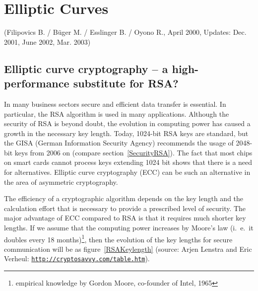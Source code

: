 
\newpage
\hypertarget{ellcurve}{}
\section{Elliptic Curves}
\label{Chapter_EllipticCurves}
(Filipovics B. / B\"uger M. / Esslinger B. / Oyono R., April 2000, Updates: Dec. 2001, June 2002, Mar. 2003)

\subsection{Elliptic curve cryptography -- a high-performance substitute for RSA?}
\label{ECAlternative}


In many business sectors secure and efficient data transfer is essential.
In particular, the RSA algorithm is used in many applications. Although the
security of RSA is beyond doubt, the evolution in computing power has
caused a growth in the necessary key length.  Today, 1024-bit RSA keys are
standard, but the GISA (German Information Security Agency)
recommends the usage of 2048-bit keys from 2006 on (compare
section~\ref{SecurityRSA}).  The fact that most chips on smart cards cannot
process keys extending 1024 bit shows that there is a need for
alternatives. Elliptic curve cryptography (ECC) can be such an
alternative in the area of asymmetric cryptography.

The efficiency of a cryptographic algorithm depends on the key length and
the calculation effort that is necessary to provide a prescribed level of
security. The major advantage of ECC compared to RSA is that it requires
much shorter key lengths. If we assume that the computing power increases
by Moore's law (i.~e.\ it doubles every 18 months)\footnote{empirical
knowledge by Gordon Moore, co-founder of Intel, 1965}, then the evolution of
the key lengths for secure communication will be as figure~\ref{RSAKeylength}
\cite{Lenstra1999} (source: Arjen Lenstra and Eric Verheul:
\href{http://cryptosavvy.com/table.htm}
{\texttt{http://cryptosavvy.com/table.htm}}).


